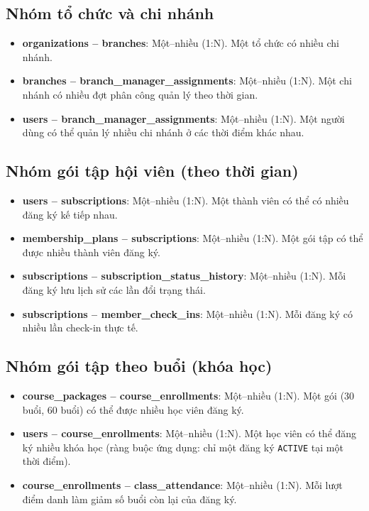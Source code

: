 \subsection*{Nhóm tổ chức và chi nhánh}
\begin{itemize}
    \item \textbf{organizations – branches}: Một–nhiều (1:N). Một tổ chức có nhiều chi nhánh.
    \item \textbf{branches – branch\_manager\_assignments}: Một–nhiều (1:N). Một chi nhánh có nhiều đợt phân công quản lý theo thời gian.
    \item \textbf{users – branch\_manager\_assignments}: Một–nhiều (1:N). Một người dùng có thể quản lý nhiều chi nhánh ở các thời điểm khác nhau.
\end{itemize}

\subsection*{Nhóm gói tập hội viên (theo thời gian)}
\begin{itemize}
    \item \textbf{users – subscriptions}: Một–nhiều (1:N). Một thành viên có thể có nhiều đăng ký kế tiếp nhau.
    \item \textbf{membership\_plans – subscriptions}: Một–nhiều (1:N). Một gói tập có thể được nhiều thành viên đăng ký.
    \item \textbf{subscriptions – subscription\_status\_history}: Một–nhiều (1:N). Mỗi đăng ký lưu lịch sử các lần đổi trạng thái.
    \item \textbf{subscriptions – member\_check\_ins}: Một–nhiều (1:N). Mỗi đăng ký có nhiều lần check-in thực tế.
\end{itemize}

\subsection*{Nhóm gói tập theo buổi (khóa học)}
\begin{itemize}
    \item \textbf{course\_packages – course\_enrollments}: Một–nhiều (1:N). Một gói (30 buổi, 60 buổi) có thể được nhiều học viên đăng ký.
    \item \textbf{users – course\_enrollments}: Một–nhiều (1:N). Một học viên có thể đăng ký nhiều khóa học (ràng buộc ứng dụng: chỉ một đăng ký \texttt{ACTIVE} tại một thời điểm).
    \item \textbf{course\_enrollments – class\_attendance}: Một–nhiều (1:N). Mỗi lượt điểm danh làm giảm số buổi còn lại của đăng ký.
\end{itemize}

